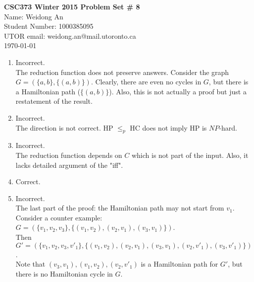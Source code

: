 \documentclass[11pt]{article}
\begin{document}
\begin{center}
{\bf \Large \bf CSC373 Winter 2015 Problem Set \# 8}\\
Name: Weidong An\\
Student Number: 1000385095\\
UTOR email: weidong.an@mail.utoronto.ca\\
\today\\
\end{center}
\begin{enumerate}
\item
Incorrect.\\
The reduction function does not preserve answers. Consider the graph $G=(\{a, b\}, \{(a, b)\})$. Clearly, there are even no cycles in $G$, but there is a Hamiltonian path (${\{(a, b)\}}$). Also, this is not actually a proof but just a restatement of the result.

\item
Incorrect.\\
The direction is not correct. HP $\leq_p$ HC does not imply HP is $NP$-hard.

\item
Incorrect.\\
The reduction function depends on $C$ which is not part of the input. Also, it lacks detailed argument of the "iff".

\item
Correct.
\item
Incorrect.\\
The last part of the proof: the Hamiltonian path may not start from $v_1$. Consider a counter example: $G = (\{v_1, v_2, v_3\}, \{(v_1, v_2), (v_2, v_1), (v_3, v_1)\})$. \\Then $G' = (\{v_1, v_2, v_3, v'_1\},\{(v_1, v_2), (v_2, v_1), (v_3, v_1), (v_2, v'_1), (v_3, v'_1)\})$.\\
Note that $(v_3, v_1), (v_1, v_2), (v_2, v'_1)$ is a Hamiltonian path for $G'$, but there is no Hamiltonian cycle in $G$.
\end{enumerate}
\end{document}
